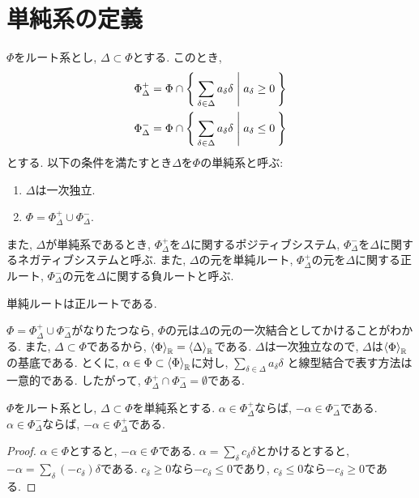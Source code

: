 \section{単純系の定義}
\begin{definition}
  $\Phi$をルート系とし, $\Delta\subset\Phi$とする.
  このとき,
  \begin{align*}
    \Phi_{\Delta}^{+}&=\Phi\cap \Set{\sum_{\delta\in\Delta}a_\delta \delta|a_\delta \geq 0}\\
    \Phi_{\Delta}^{-}&=\Phi\cap \Set{\sum_{\delta\in\Delta}a_\delta \delta|a_\delta \leq 0}
  \end{align*}
  とする.
  以下の条件を満たすとき$\Delta$を$\Phi$の単純系と呼ぶ:
  \begin{enumerate}
  \item $\Delta$は一次独立. %
  \item $\Phi = \Phi_\Delta^{+}\cup \Phi_\Delta^{-}$.
  \end{enumerate}
  また, $\Delta$が単純系であるとき,
  $\Phi_{\Delta}^+$を$\Delta$に関するポジティブシステム,
  $\Phi_{\Delta}^-$を$\Delta$に関するネガティブシステムと呼ぶ.
  また,
  $\Delta$の元を単純ルート,
  $\Phi_{\Delta}^+$の元を$\Delta$に関する正ルート,
  $\Phi_{\Delta}^-$の元を$\Delta$に関する負ルートと呼ぶ.
\end{definition}
\begin{remark}
  単純ルートは正ルートである.
\end{remark}
\begin{remark}
  $\Phi = \Phi_\Delta^{+}\cup \Phi_\Delta^{-}$がなりたつなら, $\Phi$の元は$\Delta$の元の一次結合としてかけることがわかる.
  また, $\Delta\subset\Phi$であるから,
  $\Braket{\Phi}_{\mathbb{R}}=\Braket{\Delta}_{\mathbb{R}}$である.
  $\Delta$は一次独立なので, $\Delta$は$\Braket{\Phi}_{\mathbb{R}}$の基底である.
  とくに,
  $\alpha\in\Phi\subset \Braket{\Phi}_{\mathbb{R}}$に対し,
  $\sum_{\delta\in\Delta}a_\delta \delta$
  と線型結合で表す方法は一意的である.
  したがって,
  $\Phi_{\Delta}^+\cap\Phi_{\Delta}^-=\emptyset$である.
\end{remark}
\begin{prop}
  \label{prop:posinega}
  $\Phi$をルート系とし, $\Delta\subset\Phi$を単純系とする.
  $\alpha\in\Phi_\Delta^+$ならば, $-\alpha\in\Phi_\Delta^-$である.
  $\alpha\in\Phi_\Delta^-$ならば, $-\alpha\in\Phi_\Delta^+$である.
\end{prop}
\begin{proof}
  $\alpha\in\Phi$とすると,
  $-\alpha\in\Phi$である.
  $\alpha=\sum_{\delta}c_\delta\delta$とかけるとすると,
  $-\alpha=\sum_{\delta}(-c_\delta)\delta$である.
  $c_\delta\geq 0$なら$-c_\delta\leq 0$であり,
  $c_\delta\leq 0$なら$-c_\delta\geq 0$である.  
\end{proof}
